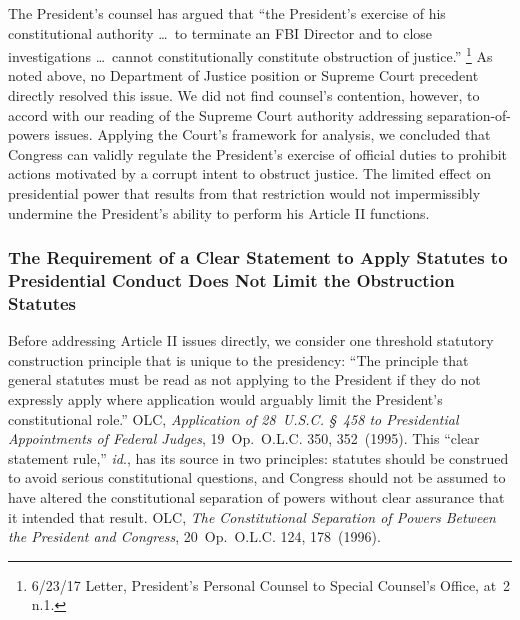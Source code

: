 The President's counsel has argued that ``the President's exercise of his constitutional authority \dots\ to terminate an FBI Director and to close investigations \dots\ cannot constitutionally constitute obstruction of justice.''%
\footnote{6/23/17 Letter, President's Personal Counsel to Special Counsel's Office, at~2 n.1.}
As noted above, no Department of Justice position or Supreme Court precedent directly resolved this issue.
We did not find counsel's contention, however, to accord with our reading of the Supreme Court authority addressing separation-of-powers issues.
Applying the Court's framework for analysis, we concluded that Congress can validly regulate the President's exercise of official duties to prohibit actions motivated by a corrupt intent to obstruct justice.
The limited effect on presidential power that results from that restriction would not impermissibly undermine the President's ability to perform his Article II functions.

\subsubsection{The Requirement of a Clear Statement to Apply Statutes to Presidential Conduct Does Not Limit the Obstruction Statutes}

Before addressing Article II issues directly, we consider one threshold statutory construction principle that is unique to the presidency: ``The principle that general statutes must be read as not applying to the President if they do not expressly apply where application would arguably limit the President's constitutional role.''
OLC, \textit{Application of 28~U.S.C. \S~458 to Presidential Appointments of Federal Judges}, 19~Op.\ O.L.C. 350, 352~(1995).
This ``clear statement rule,'' \textit{id}., has its source in two principles: statutes should be construed to avoid serious constitutional questions, and Congress should not be assumed to have altered the constitutional separation of powers without clear assurance that it intended that result.
OLC, \textit{The Constitutional Separation of Powers Between the President and Congress}, 20~Op.\ O.L.C. 124, 178~(1996).


